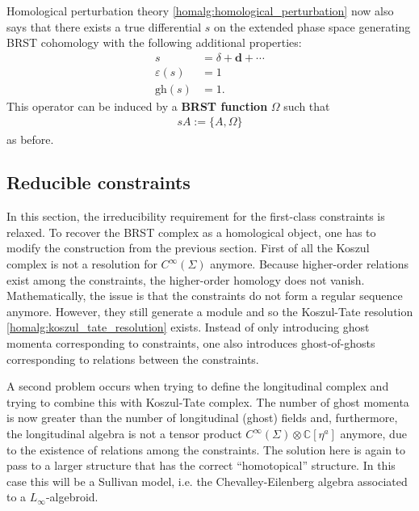     Homological perturbation theory \ref{homalg:homological_perturbation} now also says that there exists a true differential $s$ on the extended phase space  generating BRST cohomology with the following additional properties:
    \begin{align}
        s &= \delta + \mathbf{d} + \cdots\nonumber\\
        \varepsilon(s) &= 1\\
        \text{gh}(s) &= 1.\nonumber
    \end{align}
    This operator can be induced by a \textbf{BRST function} $\Omega$ such that
    \begin{gather}
        sA := \{A,\Omega\}
    \end{gather}
    as before.

\subsection{Reducible constraints}

    In this section, the irreducibility requirement for the first-class constraints is relaxed. To recover the BRST complex as a homological object, one has to modify the construction from the previous section. First of all the Koszul complex is not a resolution for $C^\infty(\Sigma)$ anymore. Because higher-order relations exist among the constraints, the higher-order homology does not vanish. Mathematically, the issue is that the constraints do not form a regular sequence anymore. However, they still generate a module and so the Koszul-Tate resolution \ref{homalg:koszul_tate_resolution} exists. Instead of only introducing ghost momenta corresponding to constraints, one also introduces ghost-of-ghosts corresponding to relations between the constraints.

    A second problem occurs when trying to define the longitudinal complex and trying to combine this with Koszul-Tate complex. The number of ghost momenta is now greater than the number of longitudinal (ghost) fields and, furthermore, the longitudinal algebra is not a tensor product $C^\infty(\Sigma)\otimes\mathbb{C}[\eta^a]$ anymore, due to the existence of relations among the constraints. The solution here is again to pass to a larger structure that has the correct ``homotopical'' structure. In this case this will be a Sullivan model, i.e. the Chevalley-Eilenberg algebra associated to a $L_\infty$-algebroid.

